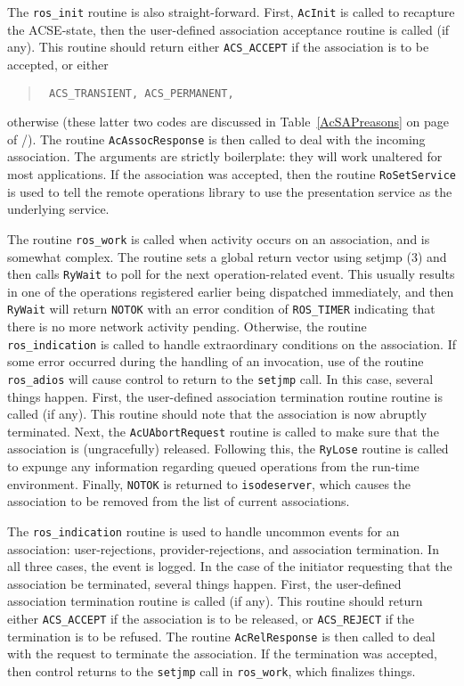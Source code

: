 The \verb"ros_init" routine is also straight-forward.
First, \verb"AcInit" is called to recapture the ACSE-state,
then the user-defined association acceptance routine is called (if any).
This routine should return either \verb"ACS_ACCEPT" if the association is to
be accepted,
or either 
\begin{quote}\tt
ACS\_TRANSIENT, ACS\_PERMANENT,\\
\end{quote}
otherwise
(these latter two codes are discussed in Table~\ref{AcSAPreasons} on
page~\pageref{AcSAPreasons} of \volone/).
The routine \verb"AcAssocResponse" is then called to deal with the incoming
association.
The arguments are strictly boilerplate:
they will work unaltered for most applications.
If the association was accepted,
then the routine \verb"RoSetService" is used to tell the remote operations
library to use the presentation service as the underlying service.

The routine \verb"ros_work" is called when activity occurs on an association,
and is somewhat complex.
The routine sets a global return vector using \man setjmp (3)
and then calls \verb"RyWait" to poll for the next operation-related event.
This usually results in one of the operations registered earlier being
dispatched immediately,
and then \verb"RyWait" will return \verb"NOTOK"
with an error condition of \verb"ROS_TIMER" indicating that there is no
more network activity pending.
Otherwise, the routine \verb"ros_indication" is called to handle
extraordinary conditions on the association.
If some error occurred during the handling of an invocation,
use of the routine \verb"ros_adios" will cause control to return to the
\verb"setjmp" call.
In this case,
several things happen.
First,
the user-defined association termination routine routine is called (if any).
This routine should note that the association is now abruptly terminated.
Next,
the \verb"AcUAbortRequest" routine is called to make sure that the association
is (ungracefully) released.
Following this,
the \verb"RyLose" routine is called to expunge any information regarding
queued operations from the run-time environment.
Finally, \verb"NOTOK" is returned to \verb"isodeserver",
which causes the association to be removed from the list of current
associations.

The \verb"ros_indication" routine is used to handle uncommon events for an
association: user-rejections, provider-rejections, and association termination.
In all three cases,
the event is logged.
In the case of the initiator requesting that the association be terminated,
several things happen.
First,
the user-defined association termination routine is called (if any).
This routine should return either \verb"ACS_ACCEPT" if the association is to
be released,
or \verb"ACS_REJECT" if the termination is to be refused.
The routine \verb"AcRelResponse" is then called to deal with the request to
terminate the association.
If the termination was accepted,
then control returns to the \verb"setjmp" call in \verb"ros_work",
which finalizes things.

